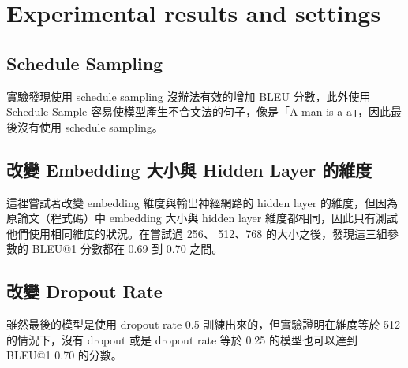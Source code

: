 \documentclass[fleqn,a4paper,12pt]{article}
\begin{document}
\section{Experimental results and settings}

\subsection{Schedule Sampling}

實驗發現使用 schedule sampling 沒辦法有效的增加 BLEU 分數，此外使用 Schedule Sample 容易使模型產生不合文法的句子，像是「A man is a a」，因此最後沒有使用 schedule sampling。

\subsection{改變 Embedding 大小與 Hidden Layer 的維度}

這裡嘗試著改變 embedding 維度與輸出神經網路的 hidden layer 的維度，但因為原論文（程式碼）中 embedding 大小與 hidden layer 維度都相同，因此只有測試他們使用相同維度的狀況。在嘗試過 256、 512、768 的大小之後，發現這三組參數的 BLEU@1 分數都在 0.69 到 0.70 之間。 

\subsection{改變 Dropout Rate}

雖然最後的模型是使用 dropout rate 0.5 訓練出來的，但實驗證明在維度等於 512 的情況下，沒有 dropout 或是 dropout rate 等於 0.25 的模型也可以達到 BLEU@1 0.70 的分數。



\end{document}
